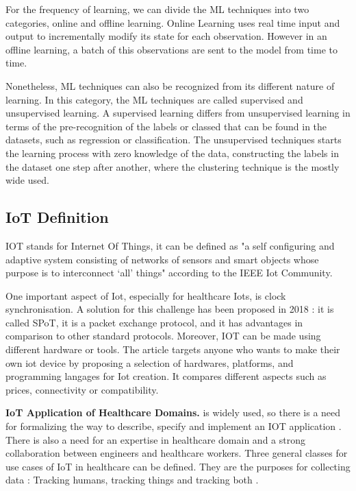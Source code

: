 For the frequency of learning, we can divide the ML techniques into two categories, online and offline learning. Online Learning uses real time input and output to incrementally modify its state for each observation. However in an offline learning, a batch of this observations are sent to the model from time to time.

Nonetheless, ML techniques can also be recognized from its different nature of learning. In this category, the ML techniques are called supervised and unsupervised learning. A supervised learning differs from unsupervised learning in terms of the pre-recognition of the labels or classed that can be found in the datasets, such as regression or classification. The unsupervised techniques starts the learning process with zero knowledge of the data, constructing the labels in the dataset one step after another, where the clustering technique is the mostly wide used. 


\subsection{IoT Definition }
 IOT stands for Internet Of Things, it can be defined as "a self configuring and adaptive system consisting 
      of networks of sensors and smart objects whose purpose is to interconnect ‘all’ things" 
      according to the IEEE Iot Community\cite{buildingIot}.
     
     One important aspect of Iot, especially for healthcare Iots, is clock synchronisation. 
      A solution for this challenge has been proposed in 2018 \cite{clockIot}:
      it is called SPoT, it is a packet exchange protocol, and it has advantages in comparison to other standard protocols. 
      Moreover, IOT can be made using different hardware or tools. The article \cite{yourOwnIot} targets anyone 
        who wants to make their own iot device by proposing a selection of           
        hardwares, platforms, and programming langages for Iot creation. 
        It compares different aspects such as prices, connectivity or compatibility.

\bigskip
\noindent\textbf{IoT Application of Healthcare Domains.} is widely used, so there is a need for
        formalizing the way to describe, specify and implement an IOT application \cite{buildingIot}. 
        There is also a need for an expertise in healthcare domain and  
        a strong collaboration between engineers and healthcare workers.
     Three general classes for use cases of IoT in healthcare can be defined. They are the purposes for  
      collecting data : Tracking humans, tracking things and tracking both \cite{buildingIot}.
        
